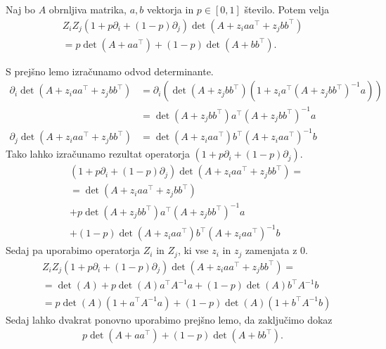 \begin{lema}\label{zizj-odvod-determinante}
    Naj bo \(A\) obrnljiva matrika, \(a,b\) vektorja in \(p\in [0,1]\) število. Potem velja
    \begin{align*}
        Z_iZ_j(1+p\partial_i + (1-p)\partial_j)\det(A + z_i aa^\top+ z_j bb^\top) \\
        = p\det(A + aa^\top) + (1-p)\det(A+bb^\top).
    \end{align*}
\end{lema}
\begin{dokaz}
    S prejšno lemo izračunamo odvod determinante.
    \begin{align*}
        \partial_i \det(A + z_i aa^\top +z_j bb^\top) & =\partial_i \left(\det(A + z_j bb^\top) (1+ z_i a^\top (A + z_j bb^\top)^{-1} a)\right) \\
                                                      & = \det(A + z_j bb^\top) a^\top (A + z_j bb^\top)^{-1} a                                 \\
        \partial_j \det(A + z_i aa^\top +z_j bb^\top) & = \det(A + z_i aa^\top) b^\top (A + z_i aa^\top)^{-1} b
    \end{align*}
    Tako lahko izračunamo rezultat operatorja \((1+p\partial_i + (1-p)\partial_j)\).
    \begin{align*}
         & (1+p\partial_i + (1-p)\partial_j)\det(A + z_i aa^\top + z_j bb^\top) = \\
         & = \det(A + z_i aa^\top + z_j bb^\top)                                  \\
         & + p\det(A + z_j bb^\top) a^\top (A + z_j bb^\top)^{-1} a               \\
         & + (1-p)\det(A + z_i aa^\top) b^\top (A + z_i aa^\top)^{-1} b
    \end{align*}
    Sedaj pa uporabimo operatorja \(Z_i\) in \(Z_j\), ki vse \(z_i\) in \(z_j\) zamenjata z \(0\).
    \begin{align*}
         & Z_iZ_j(1+p\partial_i + (1-p)\partial_j)\det(A + z_i aa^\top+ z_j bb^\top) = \\
         & =\det(A) + p\det(A) a^\top A^{-1} a + (1-p)\det(A) b^\top A^{-1} b          \\
         & = p \det(A)(1+ a^\top A^{-1}a) + (1-p)\det(A)(1+b^\top A^{-1} b)
    \end{align*}
    Sedaj lahko dvakrat ponovno uporabimo prejšno lemo, da zaključimo dokaz
    \begin{align*}
        p \det(A + aa^\top) + (1-p)\det(A+bb^\top).
    \end{align*}
\end{dokaz}

